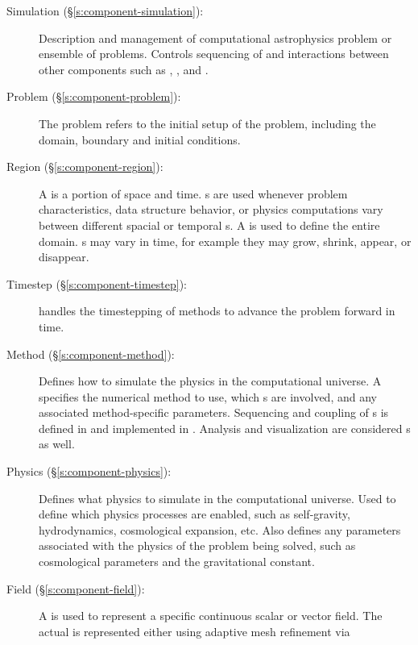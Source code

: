 \begin{description}
%
 \item [Simulation (\S\ref{s:component-simulation}): ]
%
        Description and management of computational astrophysics
        problem or ensemble of problems.  Controls sequencing of and
        interactions between other components such as ,
        , and .
%
 \item [Problem (\S\ref{s:component-problem}): ]
%
        The problem refers to the initial setup of the problem,
        including the domain, boundary and initial conditions.
%
 \item [Region (\S\ref{s:component-region}): ]
%
        A  is a portion of space and time.
        s are used whenever problem characteristics, data
        structure behavior, or physics computations vary between
        different spacial or temporal s.  A 
        is used to define the entire domain.  s may vary
        in time, for example they may grow, shrink, appear, or
        disappear.
%
 \item [Timestep (\S\ref{s:component-timestep}): ]
%
         handles the timestepping of methods to advance
        the problem forward in time.
%
 \item [Method (\S\ref{s:component-method}): ]
%
        Defines how to simulate the physics in the computational
        universe.  A  specifies the numerical method to
        use, which s are involved, and any associated
        method-specific parameters.  Sequencing and coupling of
        s is defined in  and implemented in
        .  Analysis and visualization are considered
        s as well.
%
 \item [Physics (\S\ref{s:component-physics}): ]
%
        Defines what physics to simulate in the computational
        universe.  Used to define which physics processes are enabled,
        such as self-gravity, hydrodynamics, cosmological expansion,
        etc.  Also defines any parameters associated with the physics
        of the problem being solved, such as cosmological parameters
        and the gravitational constant.
%
 \item [Field (\S\ref{s:component-field}): ]
%
        A  is used to represent a specific continuous
        scalar or vector field.  The actual  is
        represented either using adaptive mesh refinement via

\end{description}
